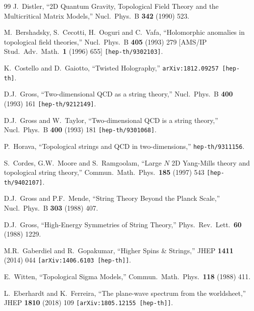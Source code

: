\documentclass[12pt,a4paper]{article}
\begin{document}
\begin{thebibliography}{99}
J.~Distler,
``2D Quantum Gravity, Topological Field Theory and the Multicritical Matrix Models,''
Nucl.\ Phys.\ B {\bf 342} (1990) 523.
     
M.~Bershadsky, S.~Cecotti, H.~Ooguri and C.~Vafa,
``Holomorphic anomalies in topological field theories,''
Nucl.\ Phys.\ B {\bf 405} (1993) 279 
[AMS/IP Stud.\ Adv.\ Math.\  {\bf 1} (1996) 655]
{\tt [hep-th/9302103]}.
 
K.~Costello and D.~Gaiotto,
``Twisted Holography,''
{\tt arXiv:1812.09257 [hep-th]}.

D.J.~Gross,
``Two-dimensional QCD as a string theory,''
Nucl.\ Phys.\ B {\bf 400} (1993) 161 
{\tt [hep-th/9212149]}.
   
D.J.~Gross and W.~Taylor,
``Two-dimensional QCD is a string theory,''
Nucl.\ Phys.\ B {\bf 400} (1993) 181
{\tt [hep-th/9301068]}.   
      
P.~Horava,
``Topological strings and QCD in two-dimensions,''
{\tt hep-th/9311156}.
 
S.~Cordes, G.W.~Moore and S.~Ramgoolam,
``Large $N$ 2D Yang-Mills theory and topological string theory,''
Commun.\ Math.\ Phys.\  {\bf 185} (1997) 543 
{\tt [hep-th/9402107]}. 
        
D.J.~Gross and P.F.~Mende,
``String Theory Beyond the Planck Scale,''
Nucl.\ Phys.\ B {\bf 303} (1988) 407.
  
D.J.~Gross,
``High-Energy Symmetries of String Theory,''
Phys.\ Rev.\ Lett.\  {\bf 60} (1988) 1229.

M.R.~Gaberdiel and R.~Gopakumar,
``Higher Spins \& Strings,''
JHEP {\bf 1411} (2014) 044
{\tt [arXiv:1406.6103 [hep-th]]}.

E.~Witten,
``Topological Sigma Models,''
Commun.\ Math.\ Phys.\  {\bf 118} (1988) 411.

  L.~Eberhardt and K.~Ferreira,
  ``The plane-wave spectrum from the worldsheet,''
  JHEP {\bf 1810} (2018) 109
  {\tt [arXiv:1805.12155 [hep-th]]}.
  

\end{thebibliography}
\end{document}

